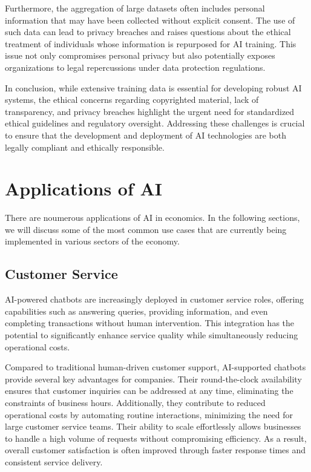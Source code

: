 Furthermore, the aggregation of large datasets often includes personal information that may have been collected without explicit consent. The use of such data can lead to privacy breaches and raises questions about the ethical treatment of individuals whose information is repurposed for AI training. This issue not only compromises personal privacy but also potentially exposes organizations to legal repercussions under data protection regulations.

In conclusion, while extensive training data is essential for developing robust AI systems, the ethical concerns regarding copyrighted material, lack of transparency, and privacy breaches highlight the urgent need for standardized ethical guidelines and regulatory oversight. Addressing these challenges is crucial to ensure that the development and deployment of AI technologies are both legally compliant and ethically responsible.



\section{Applications of AI }
\label{sec:applications-of-ai}

There are noumerous applications of AI in economics. In the following sections, we will discuss some of the most common use cases that are 
currently being implemented in various sectors of the economy.

\subsection{Customer Service}
\label{subsec:customer-service}

AI-powered chatbots are increasingly deployed in customer service roles, offering capabilities such as answering queries, providing information, and even completing transactions without human intervention. This integration has the potential to significantly enhance service quality while simultaneously reducing operational costs.  

Compared to traditional human-driven customer support, AI-supported chatbots provide several key advantages for companies. Their round-the-clock availability ensures that customer inquiries can be addressed at any time, eliminating the constraints of business hours. Additionally, they contribute to reduced operational costs by automating routine interactions, minimizing the need for large customer service teams. Their ability to scale effortlessly allows businesses to handle a high volume of requests without compromising efficiency. As a result, overall customer satisfaction is often improved through faster response times and consistent service delivery.  

